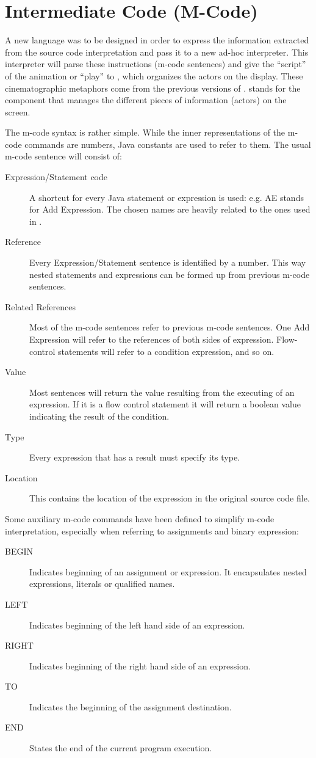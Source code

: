 \section{Intermediate Code (M-Code)}
\label{sec:Intermediate_Code}

A new language was to be designed in order to express the information extracted from the
source code interpretation and pass it to a new ad-hoc interpreter.
This interpreter will parse these instructions (m-code sentences)
and give the ``script'' of the animation or ``play'' to ,
which organizes the actors on the display. These cinematographic metaphors
come from the previous versions of \jel{}.  stands for the
component that manages the different pieces of information (actors)
on the screen.

The m-code syntax is rather simple. While the inner representations
of the m-code commands are numbers, Java constants are used to
refer to them. The usual m-code sentence will consist of:

\begin{description}
\item[Expression/Statement code] A shortcut for every Java statement
or expression is used: e.g. AE stands for Add Expression. The
chosen names are heavily related to the ones used in \djava{}.
\item[Reference] Every Expression/Statement sentence
is identified by a number. This way nested statements and expressions
can be formed up from previous {m-code} sentences.
\item[Related References] Most of the {m-code} sentences refer
to previous m-code sentences. One Add Expression will refer to
the references of both sides of expression. Flow-control statements
will refer to a condition expression, and so on.
\item[Value] Most sentences will return the value resulting from
the executing of an expression. If it is a flow control statement
it will return a boolean value indicating the result of the condition.
\item[Type] Every expression that has a result must specify
its type.
\item[Location] This contains the location of the expression
in the original source code file.
\end{description}

Some auxiliary {m-code} commands have been defined to simplify m-code
interpretation, especially when referring to assignments and binary expression:
\begin{description}
\item[BEGIN] Indicates beginning of an assignment or expression.
It encapsulates nested expressions, literals or qualified names.
\item[LEFT] Indicates beginning of the left hand side of an expression.
\item[RIGHT] Indicates beginning of the right hand side of an expression.
\item[TO] Indicates the beginning of the assignment destination.
\item[END]  States the end of the current program execution.
\end{description}

